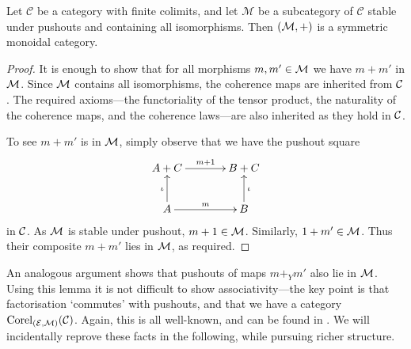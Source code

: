 \begin{lemma} \label{lem.mcoproductsmc}
  Let $\mathcal C$ be a category with finite colimits, and let $\mathcal M$ be a
  subcategory of $\mathcal C$ stable under pushouts and containing all
  isomorphisms. Then $(\mathcal M,+)$ is a symmetric monoidal category.
\end{lemma}
\begin{proof}
  It is enough to show that for all morphisms $m,m' \in \mathcal M$ we have $m+m'$ in
  $\mathcal M$. Since $\mathcal M$ contains all isomorphisms, the coherence maps are
  inherited from $\mathcal C$. The required axioms---the functoriality of the tensor
  product, the naturality of the coherence maps, and the coherence laws---are
  also inherited as they hold in $\mathcal C$.

  To see $m+m'$ is in $\mathcal M$, simply observe that we have the pushout square
  \[
  \xymatrixcolsep{3pc}
  \xymatrixrowsep{2pc}
    \xymatrix{
      A+C \ar[r]^{m+1} & B+C \\
      A \ar[r]^m \ar[u]^{\iota} & B \ar[u]_{\iota} \\
    }
  \]
  in $\mathcal C$. As $\mathcal M$ is stable under pushout, $m+1 \in \mathcal M$. Similarly,
  $1+m' \in \mathcal M$. Thus their composite $m+m'$ lies in $\mathcal M$, as required.
\end{proof}

An analogous argument shows that pushouts of maps $m+_Ym'$ also lie in $\mathcal M$.
Using this lemma it is not difficult to show associativity---the key point is
that factorisation `commutes' with pushouts, and that we have a category
$\operatorname{{Corel}}_{(\mathcal E,\mathcal M)}(\mathcal C)$. Again, this is all well-known, and can be found
in \cite{JayWar00}. We will incidentally reprove these facts in the following,
while pursuing richer structure.


